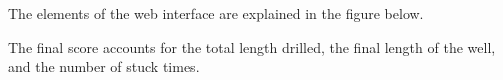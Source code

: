 
The elements of the web interface are explained in the figure below.




The final score accounts for the total length drilled, the final length of the well, and the number of stuck times. 